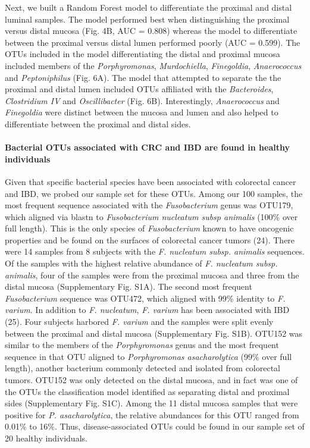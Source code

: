 \documentclass[12pt,]{article}
\let\oldparagraph\paragraph
\renewcommand{\paragraph}[1]{\oldparagraph{#1}\mbox{}}
\begin{document}
Next, we built a Random Forest model to differentiate the proximal and
distal luminal samples. The model performed best when distinguishing the
proximal versus distal mucosa (Fig. 4B, AUC = 0.808) whereas the model
to differentiate between the proximal versus distal lumen performed
poorly (AUC = 0.599). The OTUs included in the model differentiating the
distal and proximal mucosa included members of the \emph{Porphyromonas},
\emph{Murdochiella}, \emph{Finegoldia}, \emph{Anaerococcus} and
\emph{Peptoniphilus} (Fig. 6A). The model that attempted to separate the
the proximal and distal lumen included OTUs affiliated with the
\emph{Bacteroides}, \emph{Clostridium IV} and \emph{Oscillibacter} (Fig.
6B). Interestingly, \emph{Anaerococcus} and \emph{Finegoldia} were
distinct between the mucosa and lumen and also helped to differentiate
between the proximal and distal sides.

\paragraph{Bacterial OTUs associated with CRC and IBD are found in
healthy
individuals}\label{bacterial-otus-associated-with-crc-and-ibd-are-found-in-healthy-individuals}

Given that specific bacterial species have been associated with
colorectal cancer and IBD, we probed our sample set for these OTUs.
Among our 100 samples, the most frequent sequence associated with the
\emph{Fusobacterium} genus was OTU179, which aligned via blastn to
\emph{Fusobacterium nucleatum subsp animalis} (100\% over full length).
This is the only species of \emph{Fusobacterium} known to have oncogenic
properties and be found on the surfaces of colorectal cancer tumors
(24). There were 14 samples from 8 subjects with the \emph{F. nucleatum
subsp. animalis} sequences. Of the samples with the highest relative
abundance of \emph{F. nucleatum subsp. animalis}, four of the samples
were from the proximal mucosa and three from the distal mucosa
(Supplementary Fig. S1A). The second most frequent \emph{Fusobacterium}
sequence was OTU472, which aligned with 99\% identity to \emph{F.
varium}. In addition to \emph{F. nucleatum}, \emph{F. varium} has been
associated with IBD (25). Four subjects harbored \emph{F. varium} and
the samples were split evenly between the proximal and distal mucosa
(Supplementary Fig. S1B). OTU152 was similar to the members of the
\emph{Porphyromonas} genus and the most frequent sequence in that OTU
aligned to \emph{Porphyromonas asacharolytica} (99\% over full length),
another bacterium commonly detected and isolated from colorectal tumors.
OTU152 was only detected on the distal mucosa, and in fact was one of
the OTUs the classification model identified as separating distal and
proximal sides (Supplementary Fig. S1C). Among the 11 distal mucosa
samples that were positive for \emph{P. asacharolytica}, the relative
abundances for this OTU ranged from 0.01\% to 16\%. Thus,
disease-associated OTUs could be found in our sample set of 20 healthy
individuals.
\end{document}
